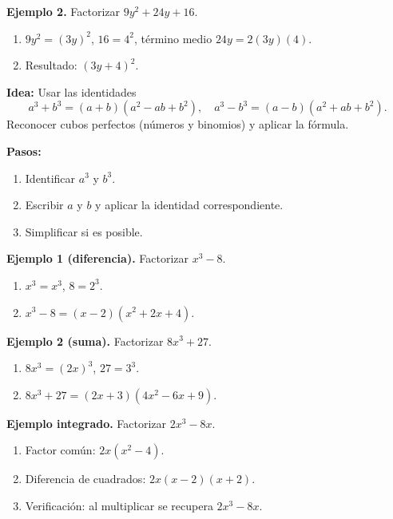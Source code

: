 \begin{example}
\textbf{Ejemplo 2.} Factorizar $9y^2+24y+16$.
\begin{enumerate}
  \item $9y^2=(3y)^2$, $16=4^2$, término medio $24y=2(3y)(4)$.
  \item Resultado: $(3y+4)^2$.
\end{enumerate}
\end{example}


\textbf{Idea:} Usar las identidades
\[
 a^3+b^3=(a+b)(a^2-ab+b^2),\quad a^3-b^3=(a-b)(a^2+ab+b^2).
\]
Reconocer cubos perfectos (números y binomios) y aplicar la fórmula.

\textbf{Pasos:}
\begin{enumerate}
  \item Identificar $a^3$ y $b^3$.
  \item Escribir $a$ y $b$ y aplicar la identidad correspondiente.
  \item Simplificar si es posible.
\end{enumerate}

\begin{example}
\textbf{Ejemplo 1 (diferencia).} Factorizar $x^3-8$.
\begin{enumerate}
  \item $x^3=x^3$, $8=2^3$.
  \item $x^3-8=(x-2)(x^2+2x+4)$.
\end{enumerate}
\end{example}

\begin{example}
\textbf{Ejemplo 2 (suma).} Factorizar $8x^3+27$.
\begin{enumerate}
  \item $8x^3=(2x)^3$, $27=3^3$.
  \item $8x^3+27=(2x+3)(4x^2-6x+9)$.
\end{enumerate}
\end{example}

\begin{example}
\textbf{Ejemplo integrado.} Factorizar $2x^3-8x$.
\begin{enumerate}
  \item Factor común: $2x(x^2-4)$.
  \item Diferencia de cuadrados: $2x(x-2)(x+2)$.
  \item Verificación: al multiplicar se recupera $2x^3-8x$.
\end{enumerate}
\end{example}

